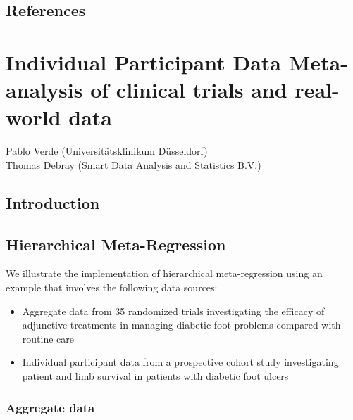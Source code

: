 \documentclass[
  letterpaper,
  DIV=11,
  numbers=noendperiod]{scrreprt}
\providecommand{\tightlist}{%
  \setlength{\itemsep}{0pt}\setlength{\parskip}{0pt}}\usepackage{longtable,booktabs,array}
\begin{document}
\hypertarget{references-3}{%
\section*{References}\label{references-3}}



\hypertarget{individual-participant-data-meta-analysis-of-clinical-trials-and-real-world-data}{%
\chapter{Individual Participant Data Meta-analysis of clinical trials
and real-world
data}\label{individual-participant-data-meta-analysis-of-clinical-trials-and-real-world-data}}

Pablo Verde (Universitätsklinikum Düsseldorf)\\
Thomas Debray (Smart Data Analysis and Statistics B.V.)

\hfill\break

\hypertarget{introduction-2}{%
\section{Introduction}\label{introduction-2}}

\hypertarget{hierarchical-meta-regression}{%
\section{Hierarchical
Meta-Regression}\label{hierarchical-meta-regression}}

We illustrate the implementation of hierarchical meta-regression using
an example that involves the following data sources:

\begin{itemize}
\tightlist
\item
  Aggregate data from 35 randomized trials investigating the efficacy of
  adjunctive treatments in managing diabetic foot problems compared with
  routine care
\item
  Individual participant data from a prospective cohort study
  investigating patient and limb survival in patients with diabetic foot
  ulcers
\end{itemize}

\hypertarget{aggregate-data}{%
\subsection{Aggregate data}\label{aggregate-data}}
\end{document}
